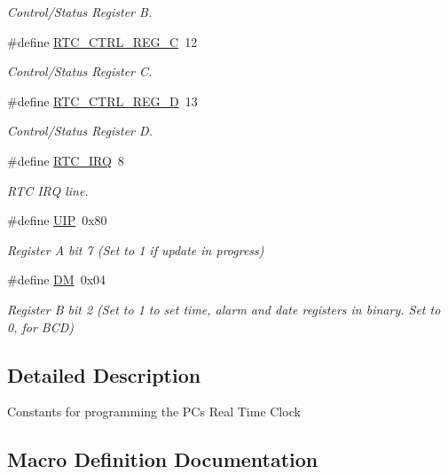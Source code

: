 \begin{DoxyCompactItemize}
\begin{DoxyCompactList}\small\item\em Control/\+Status Register B. \end{DoxyCompactList}\item 
\#define \hyperlink{group__RTC_gaddc26b195748368226569ac42ce54871}{R\+T\+C\+\_\+\+C\+T\+R\+L\+\_\+\+R\+E\+G\+\_\+C}~12
\begin{DoxyCompactList}\small\item\em Control/\+Status Register C. \end{DoxyCompactList}\item 
\#define \hyperlink{group__RTC_ga714f6dd6cc47f551c1a5fe3b28cc0e86}{R\+T\+C\+\_\+\+C\+T\+R\+L\+\_\+\+R\+E\+G\+\_\+D}~13
\begin{DoxyCompactList}\small\item\em Control/\+Status Register D. \end{DoxyCompactList}\item 
\#define \hyperlink{group__RTC_ga4e22feb6ffbc1cda32fadff5c740dc51}{R\+T\+C\+\_\+\+I\+RQ}~8
\begin{DoxyCompactList}\small\item\em R\+TC I\+RQ line. \end{DoxyCompactList}\item 
\#define \hyperlink{group__RTC_ga3289eebd69837790d4aacaccd18d46db}{U\+IP}~0x80
\begin{DoxyCompactList}\small\item\em Register A bit 7 (Set to 1 if update in progress) \end{DoxyCompactList}\item 
\#define \hyperlink{group__RTC_ga9a9aac904e687286501946469e2903d6}{DM}~0x04
\begin{DoxyCompactList}\small\item\em Register B bit 2 (Set to 1 to set time, alarm and date registers in binary. Set to 0, for B\+CD) \end{DoxyCompactList}\end{DoxyCompactItemize}


\subsection{Detailed Description}
Constants for programming the PC\textquotesingle{}s Real Time Clock 

\subsection{Macro Definition Documentation}
\mbox{\label{group__RTC_ga9a9aac904e687286501946469e2903d6}} 

